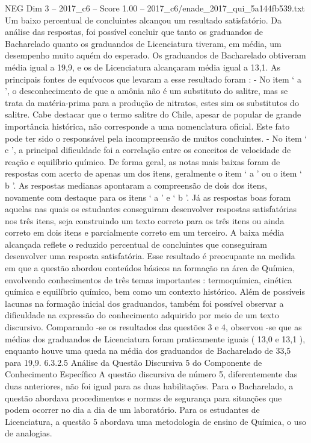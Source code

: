 \begin{textsample}{NEG Dim 3 – 2017\_c6 – Score 1.00 – 2017\_c6/enade\_2017\_qui\_5a144fb539.txt}
Um baixo percentual de concluintes alcançou um resultado satisfatório.
Da análise das respostas, foi possível concluir que tanto os graduandos de Bacharelado quanto os graduandos de Licenciatura tiveram, em média, um desempenho muito aquém do esperado.
Os graduandos de Bacharelado obtiveram média igual a 19,9, e os de Licenciatura alcançaram média igual a 13,1.
As principais fontes de equívocos que levaram a esse resultado foram : - No item ‘ a ’, o desconhecimento de que a amônia não é um substituto do salitre, mas se trata da matéria-prima para a produção de nitratos, estes sim os substitutos do salitre.
Cabe destacar que o termo salitre do Chile, apesar de popular de grande importância histórica, não corresponde a uma nomenclatura oficial.
Este fato pode ter sido o responsável pela incompreensão de muitos concluintes. - No item ‘ c ’, a principal dificuldade foi a correlação entre os conceitos de velocidade de reação e equilíbrio químico.
De forma geral, as notas mais baixas foram de respostas com acerto de apenas um dos itens, geralmente o item ‘ a ’ ou o item ‘ b ’.
As respostas medianas apontaram a compreensão de dois dos itens, novamente com destaque para os itens ‘ a ’ e ‘ b ’.
Já as respostas boas foram aquelas nas quais os estudantes conseguiram desenvolver respostas satisfatórias nos três itens, seja construindo um texto correto para os três itens ou ainda correto em dois itens e parcialmente correto em um terceiro.
A baixa média alcançada reflete o reduzido percentual de concluintes que conseguiram desenvolver uma resposta satisfatória.
Esse resultado é preocupante na medida em que a questão abordou conteúdos básicos na formação na área de Química, envolvendo conhecimentos de três temas importantes : termoquímica, cinética química e equilíbrio químico, bem como um contexto histórico.
Além de possíveis lacunas na formação inicial dos graduandos, também foi possível observar a dificuldade na expressão do conhecimento adquirido por meio de um texto discursivo.
Comparando -se os resultados das questões 3 e 4, observou -se que as médias dos graduandos de Licenciatura foram praticamente iguais ( 13,0 e 13,1 ), enquanto houve uma queda na média dos graduandos de Bacharelado de 33,5 para 19,9. 6.3.2.5 Análise da Questão Discursiva 5 do Componente de Conhecimento Específico A questão discursiva de número 5, diferentemente das duas anteriores, não foi igual para as duas habilitações.
Para o Bacharelado, a questão abordava procedimentos e normas de segurança para situações que podem ocorrer no dia a dia de um laboratório.
Para os estudantes de Licenciatura, a questão 5 abordava uma metodologia de ensino de Química, o uso de analogias.

\end{textsample}
